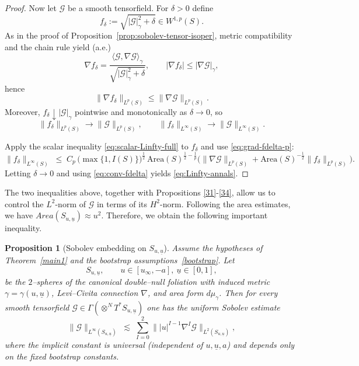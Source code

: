 \documentclass{amsart}
\newtheorem{proposition}{Proposition}[section]
\newcommand{\ubar}{\underline{u}}
\begin{document}
{\begin{proof}
\medskip
\noindent Now let $\mathcal G$ be a smooth tensorfield. For $\delta>0$ define
\[
f_\delta:=\sqrt{|\mathcal G|_\gamma^2+\delta}\in W^{1,p}(S).
\]
As in the proof of Proposition~\ref{prop:sobolev-tensor-isoper}, metric compatibility and the chain rule yield (a.e.)
\[
\nabla f_\delta
=
\frac{\langle\mathcal G,\nabla\mathcal G\rangle_\gamma}{\sqrt{|\mathcal G|_\gamma^2+\delta}},
\qquad
|\nabla f_\delta|
\le
|\nabla\mathcal G|_\gamma,
\]
hence
\begin{equation}\label{eq:grad-fdelta-p}
\|\nabla f_\delta\|_{L^p(S)}\le \|\nabla\mathcal G\|_{L^p(S)}.
\end{equation}
Moreover, $f_\delta\downarrow |\mathcal G|_\gamma$ pointwise and monotonically as $\delta\to0$, so
\begin{equation}\label{eq:conv-fdelta}
\|f_\delta\|_{L^p(S)}\to \|\mathcal G\|_{L^p(S)},
\qquad
\|f_\delta\|_{L^\infty(S)}\to \|\mathcal G\|_{L^\infty(S)}.
\end{equation}

\noindent Apply the scalar inequality \eqref{eq:scalar-Linfty-full} to $f_\delta$ and use \eqref{eq:grad-fdelta-p}:
\[
\|f_\delta\|_{L^\infty(S)}
\;\le\;
C_p\,\big(\max\{1,I(S)\}\big)^{\frac12}\,
\text{Area}(S)^{\frac12-\frac1p}
\Big(
\|\nabla \mathcal G\|_{L^p(S)}
+
\text{Area}(S)^{-\frac12}\|f_\delta\|_{L^p(S)}
\Big).
\]
Letting $\delta\to0$ and using \eqref{eq:conv-fdelta} yields \eqref{eq:Linfty-annals}.
\end{proof}

\noindent The two inequalities above, together with Propositions \ref{31}-\ref{34}, allow us to control the $L^{2}$-norm of $\mathcal{G}$ in terms of its $H^{2}$-norm. Following the area estimates, we have $Area(S_{u,\ubar})\approx u^{2}$. Therefore, we obtain the following important inequality.\\ 
\begin{proposition}[Sobolev embedding on $S_{u,\ubar}$]\label{Sobolev}
Assume the hypotheses of Theorem~\ref{main1} and the bootstrap assumptions~\eqref{bootstrap}. Let
\[
S_{u,\ubar},\qquad u\in[u_\infty,-a],\ \ubar\in[0,1],
\]
be the $2$--spheres of the canonical double--null foliation with induced metric $\gamma=\gamma(u,\ubar)$, Levi--Civita connection $\nabla$, and area form $d\mu_\gamma$. Then for every smooth tensorfield
$\mathcal G\in\Gamma(\otimes^N T^*S_{u,\ubar})$ one has the uniform Sobolev estimate
\begin{equation}\label{eq:Sobolev-Linfty-annals}
\|\mathcal G\|_{L^\infty(S_{u,\ubar})}
\;\lesssim\;
\sum_{I=0}^{2}\big\||u|^{I-1}\nabla^{I}\mathcal G\big\|_{L^{2}(S_{u,\ubar})},
\end{equation}
where the implicit constant is universal (independent of $u,\ubar,a$) and depends only on the fixed bootstrap constants.


\end{proposition}}
\end{document}
